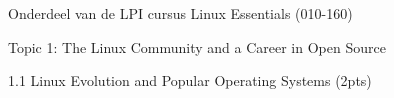 Onderdeel van de LPI cursus Linux Essentials (010-160)

Topic 1: The Linux Community and a Career in Open Source

1.1 Linux Evolution and Popular Operating Systems (2pts)

